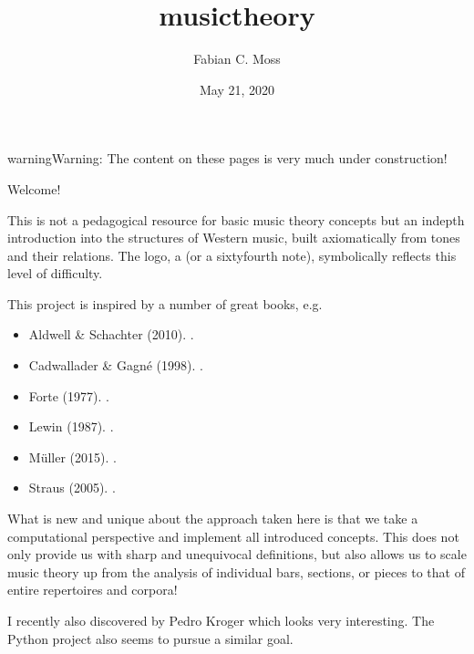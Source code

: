 \documentclass[letterpaper,10pt,english]{sphinxmanual}
\title{musictheory}
\date{May 21, 2020}
\author{Fabian C.\@{} Moss}
\begin{document}
\pagestyle{empty}
\sphinxmaketitle
\pagestyle{plain}
\sphinxtableofcontents
\pagestyle{normal}
\label{\detokenize{index::doc}}


\begin{sphinxadmonition}{warning}{Warning:}
The content on these pages is very much under construction!
\end{sphinxadmonition}

Welcome!

This is not a pedagogical resource for basic music theory concepts
but an in\sphinxhyphen{}depth introduction into the structures of Western music,
built axiomatically from tones and their relations.
The logo, a  (or a sixty\sphinxhyphen{}fourth note),
symbolically reflects this level of difficulty.

This project is inspired by a number of great books, e.g.
\begin{itemize}
\item {} 
Aldwell \& Schachter (2010). .

\item {} 
Cadwallader \& Gagné (1998). .

\item {} 
Forte (1977). .

\item {} 
Lewin (1987). .

\item {} 
Müller (2015). .

\item {} 
Straus (2005). .

\end{itemize}

What is new and unique about the approach taken here is that we take
a computational perspective and implement all introduced concepts.
This does not only provide us with sharp and unequivocal definitions,
but also allows us to scale music theory up from the analysis of individual
bars, sections, or pieces to that of entire repertoires and corpora!

I recently also discovered  by Pedro Kroger
which looks very interesting.
The Python project  also seems to pursue a similar goal.
\end{document}
